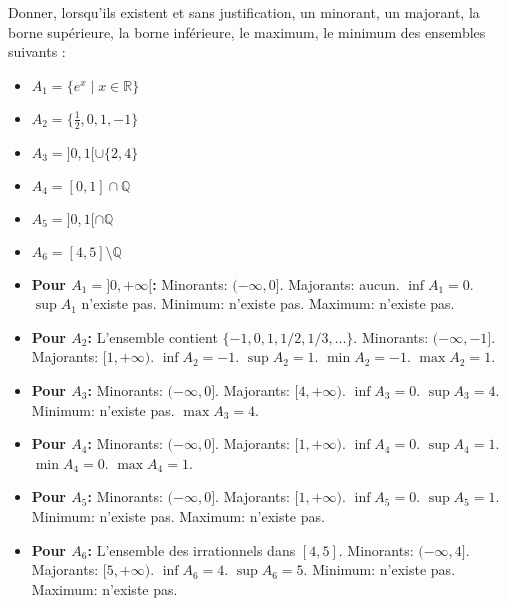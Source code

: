 \documentclass[solutions]{exercices}
\begin{document}

\begin{exercice}
Donner, lorsqu'ils existent et sans justification, un minorant, un majorant, la borne supérieure, la borne inférieure, le maximum, le minimum des ensembles suivants :
\begin{multicols}{2}
	\begin{itemize}
		\item $A_1 = \{e^x \mid x \in \mathbb{R}\}$
		\item $A_2 = \{\frac{1}{2}, 0, 1, -1\}$
		\item $A_3 = ]0, 1[ \cup \{2, 4\}$
		\item $A_4 = [0, 1] \cap \mathbb{Q}$
		\item $A_5 = ]0, 1[ \cap \mathbb{Q}$
		\item $A_6 = [4, 5] \setminus \mathbb{Q}$
	\end{itemize}
\end{multicols}
\end{exercice}

\begin{solution}
	\begin{itemize}
		\item \textbf{Pour $A_1 = ]0, +\infty[$:}
		      Minorants: $(-\infty, 0]$. Majorants: aucun. $\inf A_1 = 0$. $\sup A_1$ n'existe pas. Minimum: n'existe pas. Maximum: n'existe pas.
		\item \textbf{Pour $A_2$:} L'ensemble contient $\{-1, 0, 1, 1/2, 1/3, \dots\}$.
		      Minorants: $(-\infty, -1]$. Majorants: $[1, +\infty)$. $\inf A_2 = -1$. $\sup A_2 = 1$. $\min A_2 = -1$. $\max A_2 = 1$.
		\item \textbf{Pour $A_3$:}
		      Minorants: $(-\infty, 0]$. Majorants: $[4, +\infty)$. $\inf A_3 = 0$. $\sup A_3 = 4$. Minimum: n'existe pas. $\max A_3 = 4$.
		\item \textbf{Pour $A_4$:}
		      Minorants: $(-\infty, 0]$. Majorants: $[1, +\infty)$. $\inf A_4 = 0$. $\sup A_4 = 1$. $\min A_4 = 0$. $\max A_4 = 1$.
		\item \textbf{Pour $A_5$:}
		      Minorants: $(-\infty, 0]$. Majorants: $[1, +\infty)$. $\inf A_5 = 0$. $\sup A_5 = 1$. Minimum: n'existe pas. Maximum: n'existe pas.
		\item \textbf{Pour $A_6$:} L'ensemble des irrationnels dans $[4,5]$.
		      Minorants: $(-\infty, 4]$. Majorants: $[5, +\infty)$. $\inf A_6 = 4$. $\sup A_6 = 5$. Minimum: n'existe pas. Maximum: n'existe pas.
	\end{itemize}
\end{solution}
\end{document}
